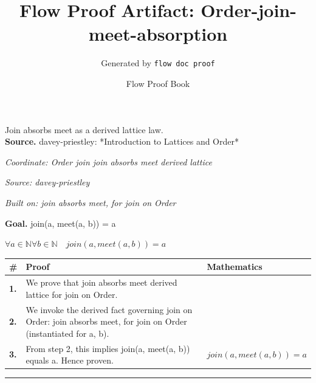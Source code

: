 \documentclass[11pt]{article}
\title{Flow Proof Artifact: Order-join-meet-absorption}
\author{Generated by \texttt{flow doc proof}}
\date{Flow Proof Book}
\theoremstyle{definition}
\begin{document}
\maketitle
Join absorbs meet as a derived lattice law.\\[0.5em]
\textbf{Source.} davey-priestley: *Introduction to Lattices and Order*\\[0.5em]
\bigskip
{}\par
\smallskip\noindent\textit{Coordinate: Order \cdot join \cdot join absorbs meet derived lattice}\par
\smallskip\noindent\textit{Source: davey-priestley}\par
\smallskip\noindent\textit{Built on: join absorbs meet, for join on Order}\par
\medskip
\noindent\textbf{Goal.} join(a, meet(a, b)) = a\par
\noindent$\displaystyle \forall a \in \mathbb{N} \forall b \in \mathbb{N}\quad join(a, meet(a, b)) = a$\par
\medskip
\noindent
\begin{tabular}{@{} >{\raggedright\arraybackslash}p{} >{\raggedright\arraybackslash}p{} >{\raggedleft\arraybackslash}p{} @{}}
\textbf{\#} & \textbf{Proof} & \textbf{Mathematics} \\
\midrule
\textbf{1.} & We prove that join absorbs meet derived lattice for join on Order. & \\[0.45em]
\textbf{2.} & We invoke the derived fact governing join on Order: join absorbs meet, for join on Order (instantiated for a, b). & \\[0.45em]
\textbf{3.} & From step 2, this implies join(a, meet(a, b)) equals a. Hence proven. & $\displaystyle join(a, meet(a, b)) = a$ \\[0.45em]
\bottomrule
\end{tabular}
\label{thm:Order-join-join_absorbs_meet_derived_lattice}
\par\medskip\hrule
\end{document}
